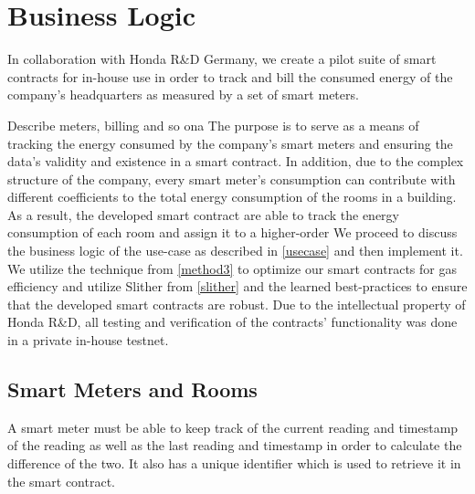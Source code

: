 
\section{Business Logic}
In collaboration with Honda R\&D Germany, we create a pilot suite of smart contracts for in-house use in order to track and bill the consumed energy of the company's headquarters as measured by a set of smart meters. 

Describe meters, billing and so ona
The purpose is to serve as a means of tracking the energy consumed by the company's smart meters and ensuring the data's validity and existence in a smart contract. In addition, due to the complex structure of the company, every smart meter's consumption can contribute with different coefficients to the total energy consumption of the rooms in a building. As a result, the developed smart contract are able to track the energy consumption of each room and assign it to a higher-order 
We proceed to discuss the business logic of the use-case as described in \ref{usecase} and then implement it. We utilize the technique from \ref{method3} to optimize our smart contracts for gas efficiency and utilize Slither from \ref{slither} and the learned best-practices to ensure that the developed smart contracts are robust. Due to the intellectual property of Honda R\&D, all testing and verification of the contracts' functionality was done in a private in-house testnet.

\subsection{Smart Meters and Rooms}

A smart meter must be able to keep track of the current reading and timestamp of the reading as well as the last reading and timestamp in order to calculate the difference of the two. It also has a unique identifier which is used to retrieve it in the smart contract.


